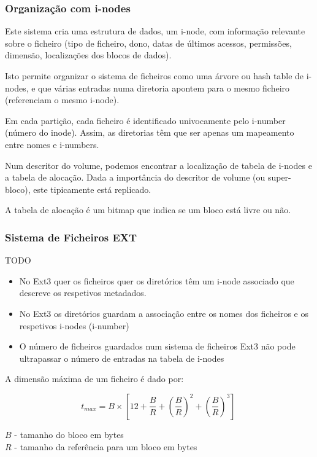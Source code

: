 \documentclass[11pt]{article}
\begin{document}
\subsubsection{Organização com i-nodes}

Este sistema cria uma estrutura de dados, um i-node, com informação relevante sobre o ficheiro (tipo de ficheiro, dono, datas de últimos acessos, permissões, dimensão, localizações dos blocos de dados).

Isto permite organizar o sistema de ficheiros como uma árvore ou hash table de i-nodes, e que várias entradas numa diretoria apontem para o mesmo ficheiro (referenciam o mesmo i-node).

Em cada partição, cada ficheiro é identificado univocamente pelo i-number (número do inode). Assim, as diretorias têm que ser apenas um mapeamento entre nomes e i-numbers.

Num descritor do volume, podemos encontrar a localização de tabela de i-nodes e a tabela de alocação. Dada a importância do descritor de volume (ou super-bloco), este tipicamente está replicado.

A tabela de alocação é um bitmap que indica se um bloco está livre ou não.

\subsubsection{Sistema de Ficheiros EXT}

TODO

\begin{itemize}
    \item No Ext3 quer os ficheiros quer os diretórios têm um i-node associado que descreve os respetivos metadados.
    \item No Ext3 os diretórios guardam a associação entre os nomes dos ficheiros e os respetivos i-nodes (i-number)
    \item O número de ficheiros guardados num sistema de ficheiros Ext3 não pode ultrapassar o número de entradas na tabela de i-nodes
\end{itemize}

A dimensão máxima de um ficheiro é dado por: \\[8pt]
\begin{minipage}{0.5\textwidth}
    \begin{equation*}
        t_{max} = B \times \left[12 + \frac{B}{R} + \left(\frac{B}{R}\right)^2
            + \left(\frac{B}{R}\right)^3 \right]\
    \end{equation*}
\end{minipage}
\begin{minipage}{0.495\textwidth}
    $B$ - tamanho do bloco em bytes \\
    $R$ - tamanho da referência para um bloco em bytes
\end{minipage}
\end{document}
